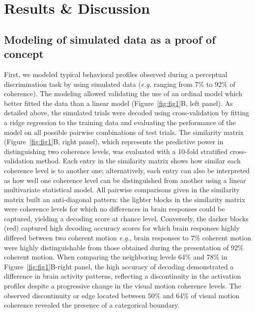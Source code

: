 \section{Results \& Discussion}
\subsection*{Modeling of simulated data as a proof of concept}

First, we modeled typical behavioral profiles observed during a perceptual discrimination task by using simulated data (\textit{e.g.} ranging from 7\% to 92\% of coherence). The modeling allowed validating the use of an ordinal model which better fitted the data than a linear model (Figure~\ref{fig:fig1}B, left panel). As detailed above, the simulated trials were decoded using cross-validation by fitting a ridge regression to the training data and evaluating the performance of the model on all possible pairwise combinations of test trials.
The similarity matrix (Figure~\ref{fig:fig1}B, right panel), which represents the predictive power in distinguishing two coherence levels, was evaluated with a 10-fold stratified cross-validation method. Each entry in the similarity matrix shows how similar each coherence level is to another one; alternatively, each entry can also be interpreted as how well one coherence level can be distinguished from another using a linear multivariate statistical model. All pairwise comparisons given in the similarity matrix built an anti-diagonal pattern: the lighter blocks in the similarity matrix were coherence levels for which no differences in brain responses could be captured, yielding a decoding score at chance level. Conversely, the darker blocks (red) captured high decoding accuracy scores for which brain responses highly differed between two coherent motion \textit{e.g.}, brain responses to 7\% coherent motion were highly distinguishable from those obtained during the presentation of 92\% coherent motion. When comparing the neighboring levels 64\% and 78\% in Figure~\ref{fig:fig1}B-right panel, the high accuracy of decoding demonstrated a difference in brain activity patterns, reflecting a discontinuity in the activation profiles despite a progressive change in the visual motion coherence levels. The observed discontinuity or edge located between 50\% and 64\% of visual motion coherence revealed the presence of a categorical boundary.\\

